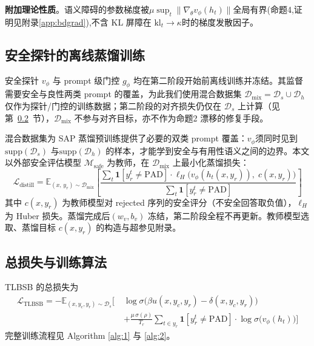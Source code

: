 \documentclass[lettersize,journal]{IEEEtran}
\begin{document}
\textbf{附加理论性质}。语义障碍的参数梯度被$\mu\sup_t\|\nabla_\theta v_\phi(h_t)\|$全局有界(命题4,证明见附录\ref{app:bdgrad}),不含 KL 屏障在 $\mathrm{kl}_t \to \kappa$时的梯度发散因子。

\subsection{安全探针的离线蒸馏训练}\label{Dmix SAP}
安全探针 $v_\phi$ 与 prompt 级门控 $g_\phi$ 均在第二阶段开始前离线训练并冻结。其监督需要安全与良性两类 prompt 的覆盖，为此我们使用混合数据集 $\mathcal{D}_{\text{mix}} = \mathcal{D}_s \cup \mathcal{D}_h$ 仅作为探针/门控的训练数据；第二阶段的对齐损失仍仅在 $\mathcal{D}_s$ 上计算（见第~\ref{sec:total-loss}~节），$\mathcal{D}_{\text{mix}}$ 不参与对齐目标，亦不作为命题2 漂移的修复手段。

混合数据集为 SAP 蒸馏预训练提供了必要的双类 prompt 覆盖：$v_\phi$须同时见到 $\mathrm{supp}(\mathcal{D}_s)$ 与$\mathrm{supp}(\mathcal{D}_h)$ 的样本，才能学到安全与有用性语义之间的边界。本文以外部安全评估模型 $\mathcal{M}_{\text{safe}}$ 为教师，在 $\mathcal{D}_{\text{mix}}$ 上最小化蒸馏损失：
\begin{equation}\label{eq:distill}
    \mathcal{L}_{\text{distill}} =
    \mathbb{E}_{(x,\,y_r)\sim\mathcal{D}_{\text{mix}}}
    \!\left[
    \frac{\displaystyle\sum_{t}\mathbf{1}[y_r^t\neq\text{PAD}]
          \cdot\ell_H\!\bigl(v_\phi(h_t(x,y_r)),\;c(x,y_r)\bigr)}
         {\displaystyle\sum_t\mathbf{1}[y_r^t\neq\text{PAD}]}
    \right]
\end{equation}
其中 $c(x,y_r)$ 为教师模型对 rejected 序列的安全评分（不安全回答取负值），$\ell_H$ 为 Huber 损失\cite{huber1965robust}。蒸馏完成后$(w_v,b_v)$ 冻结，第二阶段全程不再更新。教师模型选取、蒸馏目标 $c(x,y_r)$ 的构造与超参见附录。

\subsection{总损失与训练算法}\label{sec:total-loss}
TLBSB 的总损失为
\begin{equation}\label{eq:total-loss}
\begin{aligned}
\mathcal{L}_{\text{TLBSB}} = -\mathbb{E}_{(x, y_c, y_r) \sim \mathcal{D}_s}
\Bigg[\;&\log\sigma\bigl(\beta u(x,y_c,y_r) - \delta(x,y_c,y_r)\bigr) \\
&+ \frac{\mu\,\sigma(\rho)}{T_r}\sum_{t \in y_r}
   \mathbf{1}[y_r^t\neq\text{PAD}]\cdot
   \log\sigma\bigl(v_\phi(h_t)\bigr)\Bigg]
\end{aligned}
\end{equation}
完整训练流程见 Algorithm \ref{alg:1} 与 \ref{alg:2}。
\end{document}
